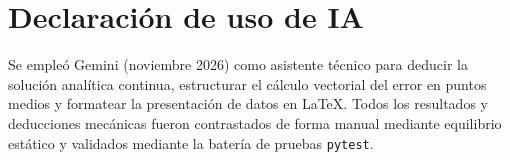 \documentclass[11pt]{article}
\begin{document}
\section*{Declaración de uso de IA}
Se empleó Gemini (noviembre 2026) como asistente técnico para deducir la solución analítica continua, estructurar el cálculo vectorial del error en puntos medios y formatear la presentación de datos en LaTeX. Todos los resultados y deducciones mecánicas fueron contrastados de forma manual mediante equilibrio estático y validados mediante la batería de pruebas \texttt{pytest}.



\end{document}

